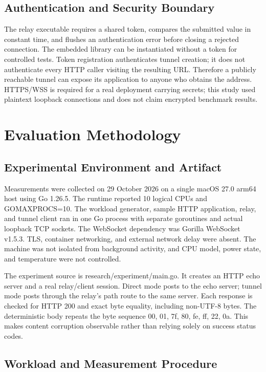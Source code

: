 \documentclass[conference]{IEEEtran}
\begin{document}
\subsection{Authentication and Security Boundary}

The relay executable requires a shared token, compares the submitted value in constant time, and flushes an authentication error before closing a rejected connection. The embedded library can be instantiated without a token for controlled tests. Token registration authenticates tunnel creation; it does not authenticate every HTTP caller visiting the resulting URL. Therefore a publicly reachable tunnel can expose its application to anyone who obtains the address. HTTPS/WSS is required for a real deployment carrying secrets; this study used plaintext loopback connections and does not claim encrypted benchmark results.

\section{Evaluation Methodology}

\subsection{Experimental Environment and Artifact}

Measurements were collected on 29 October 2026 on a single macOS 27.0 arm64 host using Go 1.26.5. The runtime reported 10 logical CPUs and GOMAXPROCS=10. The workload generator, sample HTTP application, relay, and tunnel client ran in one Go process with separate goroutines and actual loopback TCP sockets. The WebSocket dependency was Gorilla WebSocket v1.5.3. TLS, container networking, and external network delay were absent. The machine was not isolated from background activity, and CPU model, power state, and temperature were not controlled.

The experiment source is research/experiment/main.go. It creates an HTTP echo server and a real relay/client session. Direct mode posts to the echo server; tunnel mode posts through the relay's path route to the same server. Each response is checked for HTTP 200 and exact byte equality, including non-UTF-8 bytes. The deterministic body repeats the byte sequence 00, 01, 7f, 80, fe, ff, 22, 0a. This makes content corruption observable rather than relying solely on success status codes.

\subsection{Workload and Measurement Procedure}
\end{document}
